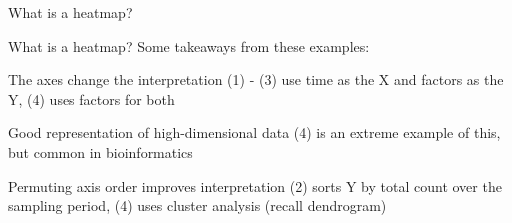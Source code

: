 \begin{frame}{What is a heatmap?}

\vspace{0.2in}

\end{frame}

\begin{frame}{What is a heatmap?}
        Some takeaways from these examples:

        \begin{itemize}
                 {\item The axes change the interpretation \newline
                      \footnotesize
                      (1) - (3) use time as the X and factors as the Y,
                      (4) uses factors for both}
                {\item \normalsize Good representation of high-dimensional data \newline
                       \footnotesize
                       (4) is an extreme example of this, but common in bioinformatics}
                {\item \normalsize Permuting axis order improves interpretation \newline
                      \footnotesize
                      (2) sorts Y by total count over the sampling period,
                      (4) uses cluster analysis (recall dendrogram)}
        \end{itemize}
\end{frame}

